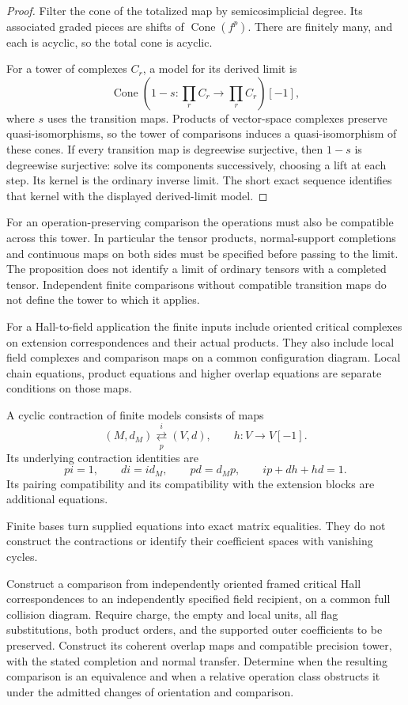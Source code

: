 \begin{proof}
Filter the cone of the totalized map by semicosimplicial degree.
Its associated graded pieces are shifts of $\operatorname{Cone}(f^p)$.
There are finitely many, and each is acyclic, so the total cone is
acyclic.

For a tower of complexes $C_r$, a model for its derived limit is
\[
 \operatorname{Cone}\left(1-s:\prod_r C_r\longrightarrow
                                  \prod_r C_r\right)[-1],
\]
where $s$ uses the transition maps. Products of vector-space
complexes preserve quasi-isomorphisms, so the tower of comparisons
induces a quasi-isomorphism of these cones. If every transition map
is degreewise surjective, then $1-s$ is degreewise surjective:
solve its components successively, choosing a lift at each step.
Its kernel is the ordinary inverse limit. The short exact sequence
identifies that kernel with the displayed derived-limit model.
\end{proof}

For an operation-preserving comparison the operations must also be
compatible across this tower. In particular the tensor products,
normal-support completions and continuous maps on both sides must
be specified before passing to the limit. The proposition does not
identify a limit of ordinary tensors with a completed tensor.
Independent finite comparisons without compatible transition maps
do not define the tower to which it applies.

For a Hall-to-field application the finite inputs include oriented
critical complexes on extension correspondences and their actual
products. They also include local field complexes and comparison
maps on a common configuration diagram. Local chain equations, product equations
and higher overlap equations are separate conditions on those maps.

A cyclic contraction of finite models consists of maps
\[
 (M,d_M)\underset{p}{\stackrel{i}{\rightleftarrows}}(V,d),
 \qquad h:V\longrightarrow V[-1].
\]
Its underlying contraction identities are
\[
 pi=1,\qquad d i=i d_M,\qquad p d=d_Mp,
 \qquad ip+dh+hd=1.
\]
Its pairing compatibility and its compatibility with the extension
blocks are additional equations.

Finite bases turn supplied equations
into exact matrix equalities. They do not construct the contractions
or identify their coefficient spaces with vanishing cycles.

\begin{problem}\label{cycmp:qn:global-comparison}
Construct a comparison from independently oriented framed critical
Hall correspondences to an independently specified field recipient,
on a common full collision diagram. Require charge, the empty and
local units, all flag substitutions, both product orders, and the
supported outer coefficients to be preserved. Construct its coherent
overlap maps and compatible precision tower, with the stated
completion and normal transfer. Determine when the resulting
comparison is an equivalence and when a relative operation class
obstructs it under the admitted changes of orientation and comparison.
\end{problem}

